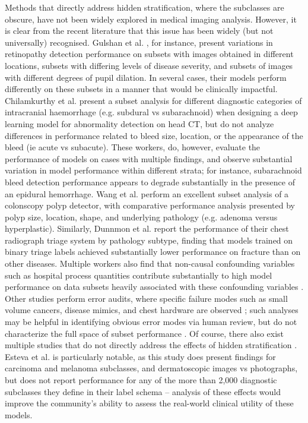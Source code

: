 \documentclass{article}
\begin{document}
Methods that directly address hidden stratification, where the subclasses are obscure, have not been widely explored in medical imaging analysis.  However, it is clear from the recent literature that this issue has been widely (but not universally) recognised.  
Gulshan et al. \citep{Gulshan2016-we}, for instance, present variations in retinopathy detection performance on subsets with images obtained in different locations, subsets with differing levels of disease severity, and subsets of images with different degrees of pupil dilation.  
In several cases, their models perform differently on these subsets in a manner that would be clinically impactful.  Chilamkurthy et al. \citep{Chilamkurthy2018-op}  present a subset analysis for different diagnostic categories of intracranial haemorrhage (e.g. subdural vs subarachnoid) when designing a deep learning model for abnormality detection on head CT, but do not analyze differences in  performance related to bleed size, location, or the appearance of the bleed (ie acute vs subacute). 
 These workers, do, however, evaluate the performance of models on cases with multiple findings, and observe substantial variation in model performance within different strata; for instance, subarachnoid bleed detection performance appears to degrade substantially in the presence of an epidural hemorrhage.  
Wang et al. \citep{Wang2019-jr} perform an excellent subset analysis of a colonscopy polyp detector, with comparative performance analysis presented by polyp size, location, shape, and underlying pathology (e.g. adenoma versus hyperplastic).  
 Similarly, Dunnmon et al. \citep{Dunnmon2019-rr} report the performance of their chest radiograph triage system by pathology subtype, finding that models trained on binary triage labels achieved substantially lower performance on fracture than on other diseases.   
 Multiple workers also find that non-causal confounding variables such as hospital process quantities contribute substantially to high model performance on data subsets heavily associated with these confounding variables \citep{Winkler2019-fw, Badgeley2019-zi, Agniel2018-qp, Zech2018-xq} . Other studies perform error audits, where specific failure modes such as small volume cancers, disease mimics, and chest hardware are observed \citep{Taylor2018-ak, Campanella2019-qs}; such analyses may be helpful in identifying obvious error modes via human review, but do not characterize the full space of subset performance \citep{Selbst2017-gz}.  
 Of course, there also exist multiple studies that do not directly address the effects of hidden stratification \citep{Haenssle2018-vw, Bien2018-ae}. 
 Esteva et al. \citep{Esteva2017-if} is particularly notable, as this study does present findings for carcinoma and melanoma subclasses, and dermatoscopic images vs photographs, but does not report performance for any of the more than 2,000 diagnostic subclasses they define in their label schema -- analysis of these effects would improve the community's ability to assess the real-world clinical utility of these models. 
 
\end{document}
